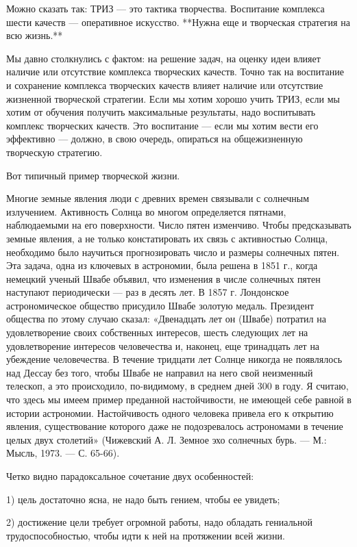 Можно сказать так: ТРИЗ — это тактика творчества. Воспитание комплекса
шести  качеств  —  оперативное  искусство. **Нужна  еще  и  творческая
стратегия на всю жизнь.**

Мы  давно столкнулись  с  фактом:  на решение  задач,  на оценку  идеи
влияет  наличие или  отсутствие  комплекса  творческих качеств.  Точно
так  на воспитание  и сохранение  комплекса творческих  качеств влияет
наличие или  отсутствие жизненной творческой стратегии.  Если мы хотим
хорошо учить  ТРИЗ, если  мы хотим  от обучения  получить максимальные
результаты,   надо  воспитывать   комплекс  творческих   качеств.  Это
воспитание  — если  мы хотим  вести его  эффективно —  должно, в  свою
очередь, опираться на общежизненную творческую стратегию.


Вот типичный пример творческой жизни.

Многие  земные явления  люди с  древних времен  связывали с  солнечным
излучением.   Активность  Солнца   во  многом   определяется  пятнами,
наблюдаемыми  на   его  поверхности.  Число  пятен   изменчиво.  Чтобы
предсказывать земные  явления, а не  только констатировать их  связь с
активностью Солнца,  необходимо было научиться прогнозировать  число и
размеры солнечных  пятен. Эта задача,  одна из ключевых  в астрономии,
была  решена  в   1851  г.,  когда  немецкий   ученый  Швабе  объявил,
что  изменения  в  числе  солнечных  пятен  наступают  периодически  —
раз  в  десять лет.  В  1857  г. Лондонское  астрономическое  общество
присудило  Швабе золотую  медаль. Президент  общества по  этому случаю
сказал: «Двенадцать  лет он  (Швабе) потратил на  удовлетворение своих
собственных интересов, шесть следующих лет на удовлетворение интересов
человечества и, наконец, еще тринадцать лет на убеждение человечества.
В течение  тридцати лет  Солнце никогда не  появлялось над  Дессау без
того, чтобы Швабе не направил на  него свой неизменный телескоп, а это
происходило, по-видимому,  в среднем  дней 300 в  году. Я  считаю, что
здесь мы имеем пример преданной  настойчивости, не имеющей себе равной
в  истории  астрономии.  Настойчивость  одного  человека  привела  его
к  открытию  явления,  существование которого  даже  не  подозревалось
астрономами в течение целых двух столетий» (Чижевский А. Л. Земное эхо
солнечных бурь. — М.: Мысль, 1973. — С. 65-66).


Четко видно парадоксальное сочетание двух особенностей:

1) цель достаточно ясна, не надо быть гением, чтобы ее увидеть;

2) достижение цели требует огромной работы, надо обладать
гениальной трудоспособностью, чтобы идти к ней на протяжении всей жизни.


